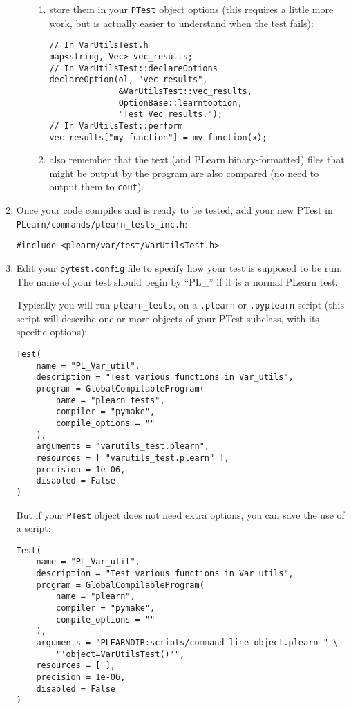 \documentclass[11pt]{book}
\begin{document}
\begin{enumerate}
\begin{itemize}
\begin{enumerate}
      \item store them in your {\tt PTest} object options (this requires
      a little more work, but is actually easier to understand when the
      test fails):
\begin{verbatim}
// In VarUtilsTest.h
map<string, Vec> vec_results;
// In VarUtilsTest::declareOptions
declareOption(ol, "vec_results",
              &VarUtilsTest::vec_results,
              OptionBase::learntoption,
              "Test Vec results.");
// In VarUtilsTest::perform
vec_results["my_function"] = my_function(x);
\end{verbatim}

      \item also remember that the text (and PLearn binary-formatted)
      files that might be output by the program are also compared (no
      need to output them to {\tt cout}).
    \end{enumerate}
  \end{itemize}

  \item Once your code compiles and is ready to be tested, add your new
  PTest in {\tt PLearn/commands/plearn\_tests\_inc.h}:
\begin{verbatim}
#include <plearn/var/test/VarUtilsTest.h>
\end{verbatim}

  \item \label{small_test}
  Edit your {\tt pytest.config} file to specify how your test is
  supposed to be run. The name of your test should begin by ``PL\_'' if
  it is a normal PLearn test.

    Typically you will run {\tt plearn\_tests}, on a {\tt .plearn}
    or {\tt .pyplearn} script (this script will describe one or more
    objects of your PTest subclass, with its specific options):
\begin{verbatim}
Test(
    name = "PL_Var_util",
    description = "Test various functions in Var_utils",
    program = GlobalCompilableProgram(
        name = "plearn_tests",
        compiler = "pymake",
        compile_options = ""
    ),
    arguments = "varutils_test.plearn",
    resources = [ "varutils_test.plearn" ],
    precision = 1e-06,
    disabled = False
)
\end{verbatim}

    But if your {\tt PTest} object does not need extra options,
    you can save the use of a script:
\begin{verbatim}
Test(
    name = "PL_Var_util",
    description = "Test various functions in Var_utils",
    program = GlobalCompilableProgram(
        name = "plearn",
        compiler = "pymake",
        compile_options = ""
    ),
    arguments = "PLEARNDIR:scripts/command_line_object.plearn " \
        "'object=VarUtilsTest()'",
    resources = [ ],
    precision = 1e-06,
    disabled = False
)
\end{verbatim}


\end{enumerate}
\end{document}
